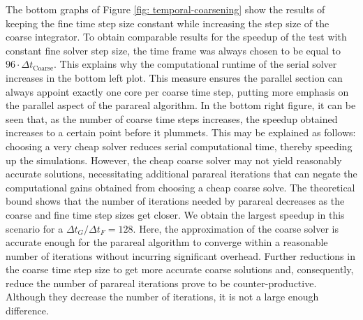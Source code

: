 The bottom graphs of Figure \ref{fig: temporal-coarsening} show the results of keeping the fine time step size constant while increasing the step size of the coarse integrator. To obtain comparable results for the speedup of the test with constant fine solver step size, the time frame was always chosen to be equal to $96\cdot\Delta t_\mathrm{Coarse}$. This explains why the computational runtime of the serial solver increases in the bottom left plot. This measure ensures the parallel section can always appoint exactly one core per coarse time step, putting more emphasis on the parallel aspect of the parareal algorithm. In the bottom right figure, it can be seen that, as the number of coarse time steps increases, the speedup obtained increases to a certain point before it plummets. This may be explained as follows: choosing a very cheap solver reduces serial computational time, thereby speeding up the simulations. However, the cheap coarse solver may not yield reasonably accurate solutions, necessitating additional parareal iterations that can negate the computational gains obtained from choosing a cheap coarse solve. The theoretical bound shows that the number of iterations needed by parareal decreases as the coarse and fine time step sizes get closer. We obtain the largest speedup in this scenario for a $\Delta t_G/\Delta t_F = 128$. 
Here, the approximation of the coarse solver is accurate enough for the parareal algorithm to converge within a reasonable number of iterations without incurring significant overhead. Further reductions in the coarse time step size to get more accurate coarse solutions and, consequently, reduce the number of parareal iterations prove to be counter-productive. Although they decrease the number of iterations, it is not a large enough difference.

